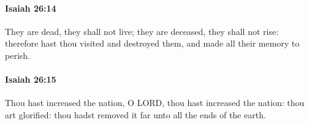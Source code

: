 		\paragraph{Isaiah 26:14} %
			\label{ISAIAH-26-14}

			They are dead, they shall not live; they are deceased, they shall not rise: therefore hast thou visited and destroyed them, and made all their memory to perish.


		\paragraph{Isaiah 26:15} %
			\label{ISAIAH-26-15}

			Thou hast increased the nation, O LORD, thou hast increased the nation: thou art glorified: thou hadst removed it far unto all the ends of the earth.


